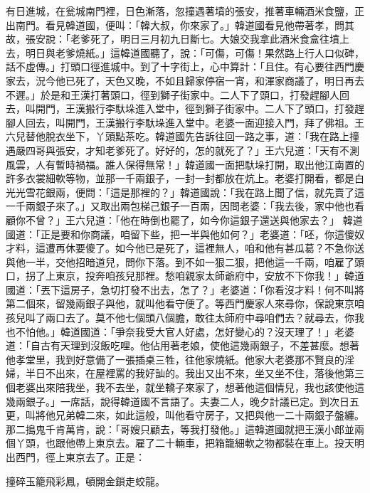 有日進城，在瓮城南門裡，日色漸落，忽撞遇著墳的張安，推著車輛酒米食鹽，正出南門。看見韓道國，便叫：「韓大叔，你來家了。」韓道國看見他帶著孝，問其故，張安說：「老爹死了，明日三月初九日斷七。大娘交我拿此酒米食盒往墳上去，明日與老爹燒紙。」這韓道國聽了，說：「可傷，可傷！果然路上行人口似碑，話不虛傳。」打頭口徑進城中。到了十字街上，心中算計：「且住。有心要往西門慶家去，況今他已死了，天色又晚，不如且歸家停宿一宵，和渾家商議了，明日再去不遲。」於是和王漢打著頭口，徑到獅子街家中。二人下了頭口，打發趕腳人回去，叫開門，王漢搬行李馱垛進入堂中，徑到獅子街家中。二人下了頭口，打發趕腳人回去，叫開門，王漢搬行李馱垛進入堂中。老婆一面迎接入門，拜了佛祖。王六兒替他脫衣坐下，丫頭點茶吃。韓道國先告訴往回一路之事，道：「我在路上撞遇嚴四哥與張安，才知老爹死了。好好的，怎的就死了？」王六兒道：「天有不測風雲，人有暫時禍福。誰人保得無常！」韓道國一面把馱垛打開，取出他江南置的許多衣裳細軟等物，並那一千兩銀子，一封一封都放在炕上。老婆打開看，都是白光光雪花銀兩，便問：「這是那裡的？」韓道國說：「我在路上聞了信，就先賣了這一千兩銀子來了。」又取出兩包梯己銀子一百兩，因問老婆：「我去後，家中他也看顧你不曾？」王六兒道：「他在時倒也罷了，如今你這銀子還送與他家去？」 韓道國道：「正是要和你商議，咱留下些，把一半與他如何？」老婆道：「呸，你這傻奴才料，這遭再休要傻了。如今他已是死了，這裡無人，咱和他有甚瓜葛？不急你送與他一半，交他招暗道兒，問你下落。到不如一狠二狠，把他這一千兩，咱雇了頭口，拐了上東京，投奔咱孩兒那裡。愁咱親家太師爺府中，安放不下你我！」韓道國道：「丟下這房子，急切打發不出去，怎了？」老婆道：「你看沒才料！何不叫將第二個來，留幾兩銀子與他，就叫他看守便了。等西門慶家人來尋你，保說東京咱孩兒叫了兩口去了。莫不他七個頭八個膽，敢往太師府中尋咱們去？就尋去，你我也不怕他。」韓道國道：「爭奈我受大官人好處，怎好變心的？沒天理了！」老婆道：「自古有天理到沒飯吃哩。他佔用著老娘，使他這幾兩銀子，不差甚麼。想著他孝堂里，我到好意備了一張插桌三牲，往他家燒紙。他家大老婆那不賢良的淫婦，半日不出來，在屋裡罵的我好訕的。我出又出不來，坐又坐不住，落後他第三個老婆出來陪我坐，我不去坐，就坐轎子來家了，想著他這個情兒，我也該使他這幾兩銀子。」一席話，說得韓道國不言語了。夫妻二人，晚夕計議已定。到次日五更，叫將他兄弟韓二來，如此這般，叫他看守房子，又把與他一二十兩銀子盤纏。那二搗鬼千肯萬肯，說：「哥嫂只顧去，等我打發他。」這韓道國就把王漢小郎並兩個丫頭，也跟他帶上東京去。雇了二十輛車，把箱籠細軟之物都裝在車上。投天明出西門，徑上東京去了。正是：

撞碎玉籠飛彩鳳，頓開金鎖走蛟龍。

